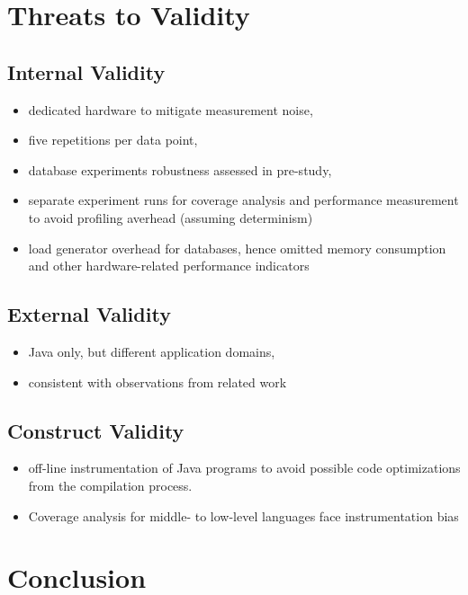 \section{Threats to Validity}\label{sec:threats}
\subsection{Internal Validity}
\begin{itemize}
	\item dedicated hardware to mitigate measurement noise, 
	\item five repetitions per data point, 
	\item database experiments robustness assessed in pre-study,
	\item separate experiment runs for coverage analysis and performance measurement to avoid profiling averhead (assuming determinism)
	\item load generator overhead for databases, hence omitted memory consumption and other hardware-related performance indicators 
\end{itemize}
\subsection{External Validity}
\begin{itemize}
	\item Java only, but different application domains,
	\item consistent with observations from related work
\end{itemize}

\subsection{Construct Validity}
\begin{itemize}
	\item off-line instrumentation of Java programs to avoid possible code optimizations from the compilation process. 
	\item Coverage analysis for middle- to low-level languages face instrumentation bias
\end{itemize}

\section{Conclusion}
